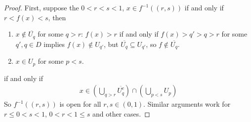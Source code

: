 \documentclass[11pt]{article}
\begin{document}
\begin{theorem}
\begin{proof}
			First, suppose the $0 < r < s < 1$, $x \in f^{-1}((r, s))$ if and only if $r < f(x) < s$, then
			\begin{enumerate}
				\item $x \notin \overline{U_q}$ for some $q > r$: $f(x) > r$ if and only if $f(x) > q' > q > r$ for some $q', q \in D$ implies $f(x) \notin U_{q'}$, but $\overline{U_q} \subseteq U_{q'}$, so $f \notin \overline{U_q}$.
				\item $x \in U_p$ for some $p < s$.
			\end{enumerate}
			if and only if
			\begin{align}
				x \in \left(
				\bigcup_{q > r} \overline{U_q^c}
				\right) \cap \left(
				\bigcup_{p < s} U_p
				\right)
			\end{align}
			So $f^{-1}((r, s))$ is open for all $r, s \in (0, 1)$. Similar arguments work for $r \leq 0 < s < 1$, $0 < r < 1 \leq s$ and other cases.
		\end{proof}
	\end{theorem}
\end{document}
